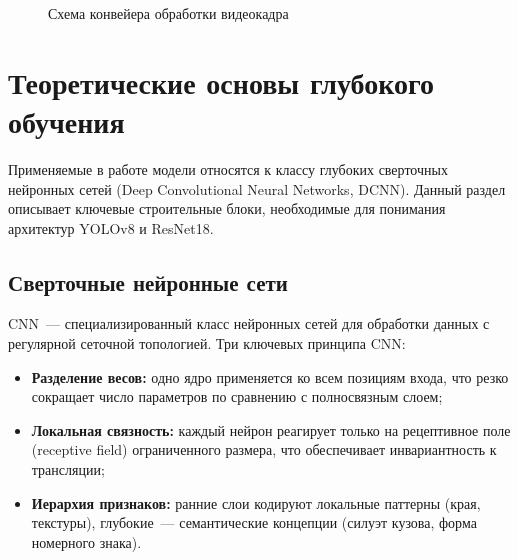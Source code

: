 \documentclass[14pt,a4paper]{report}
\numberwithin{equation}{chapter}
\numberwithin{figure}{chapter}
\numberwithin{table}{chapter}
\begin{document}
\begin{figure}[H]
{%
}
\caption{Схема конвейера обработки видеокадра}
\label{fig:pipeline}
\end{figure}

\section{Теоретические основы глубокого обучения}

Применяемые в работе модели относятся к классу глубоких сверточных
нейронных сетей (Deep Convolutional Neural Networks, DCNN).
Данный раздел описывает ключевые строительные блоки, необходимые
для понимания архитектур YOLOv8 и ResNet18.

\subsection{Сверточные нейронные сети}

CNN~--- специализированный класс нейронных сетей для обработки
данных с регулярной сеточной топологией. Три ключевых принципа CNN:
\begin{itemize}
  \item \textbf{Разделение весов:} одно ядро применяется ко всем
    позициям входа, что резко сокращает число параметров по
    сравнению с полносвязным слоем;
  \item \textbf{Локальная связность:} каждый нейрон реагирует
    только на рецептивное поле (receptive field) ограниченного
    размера, что обеспечивает инвариантность к трансляции;
  \item \textbf{Иерархия признаков:} ранние слои кодируют
    локальные паттерны (края, текстуры), глубокие~---
    семантические концепции (силуэт кузова, форма номерного знака).
\end{itemize}
\end{document}
